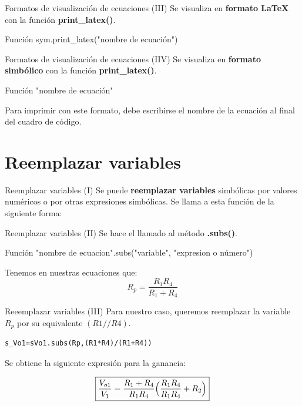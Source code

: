 \documentclass[14pt, aspectratio= 169]{beamer}
\begin{document}
\begin{frame}{Formatos de visualización de ecuaciones (III)}
Se visualiza en \textbf{formato LaTeX} con la función \textbf{print\_latex()}.
\begin{block}{Función}
sym.print\_latex("nombre de ecuación")
\end{block}
\end{frame}


\begin{frame}{Formatos de visualización de ecuaciones (IIV)}
Se visualiza en \textbf{formato simbólico} con la función \textbf{print\_latex()}.
\begin{block}{Función}
"nombre de ecuación"
\end{block}
Para imprimir con este formato, debe escribirse el nombre de la ecuación al final del cuadro de código.
\end{frame}

% 
\section{Reemplazar variables}
\begin{frame}{Reemplazar variables (I)}
Se puede \textbf{reemplazar variables} simbólicas por valores numéricos o por otras expresiones simbólicas. Se llama a esta función de la siguiente forma: 
\end{frame}

\begin{frame}{Reemplazar variables (II)}
Se hace el llamado al método \textbf{.subs()}.
\begin{block}{Función}
"nombre de ecuacion".subs("variable", "expresion o número")
\end{block}

Tenemos en nuestras ecuaciones que:
$$ R_{p}= \frac{R_{1}R_{4}}{R_{1}+R_{4}}$$

\end{frame}

\begin{frame}[fragile]{Reeemplazar variables (III)}
Para nuestro caso, queremos reemplazar la variable $R_{p}$ por su equivalente $(R1//R4)$.
\begin{lstlisting}[style=python]
s_Vo1=sVo1.subs(Rp,(R1*R4)/(R1+R4))
\end{lstlisting}
Se obtiene la siguiente expresión para la ganancia:

$$ \boxed{ \frac{V_{o1}}{V_{1}}= \frac{R_{1}+R_{4}}{R_{1}R_{4}} \Bigl(\frac{R_{1}R_{4}}{R_{1}R_{4}}+R_{2}\Bigl) } $$
\end{frame}
\end{document}
